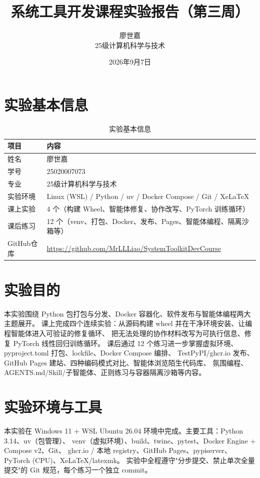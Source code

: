 \documentclass[UTF8]{ctexart}
\title{\textbf{系统工具开发课程实验报告（第三周）}}
\author{廖世嘉 \quad 25020007073 \\ 25级计算机科学与技术}
\date{2026年9月7日}
\begin{document}
\maketitle
\tableofcontents
\newpage

\section{实验基本信息}

\begin{table}[H]
\centering
\caption{实验基本信息}
\label{tab:info}
\begin{tabular}{ll}
\toprule
项目 & 内容 \\
\midrule
姓名 & 廖世嘉 \\
学号 & 25020007073 \\
专业 & 25级计算机科学与技术 \\
实验环境 & Linux (WSL) / Python / uv / Docker Compose / Git / XeLaTeX \\
课上实验 & 4 个（构建 Wheel、智能体修复、协作改写、PyTorch 训练循环）\\
课后练习 & 12 个（venv、打包、Docker、发布、Pages、智能体编程、隔离沙箱等）\\
GitHub仓库 & \href{https://github.com/MrLLLiao/SystemToolkitDevCourse}{https://github.com/MrLLLiao/SystemToolkitDevCourse} \\
\bottomrule
\end{tabular}
\end{table}

\section{实验目的}

本实验围绕 Python 包打包与分发、Docker 容器化、软件发布与智能体编程两大主题展开。
课上完成四个连续实验：从源码构建 wheel 并在干净环境安装、让编程智能体进入可验证的修复循环、
把无法处理的协作材料改写为可执行信息、修复 PyTorch 线性回归训练循环。
课后通过 12 个练习进一步掌握虚拟环境、pyproject.toml 打包、lockfile、Docker Compose 编排、
TestPyPI/ghcr.io 发布、GitHub Pages 建站、四种编码模式对比、智能体浏览陌生代码库、
氛围编程、AGENTS.md/Skill/子智能体、正则练习与容器隔离沙箱等内容。

\section{实验环境与工具}

本实验在 Windows 11 + WSL Ubuntu 26.04 环境中完成。主要工具：Python 3.14、uv（包管理）、
venv（虚拟环境）、build、twine、pytest、Docker Engine + Compose v2、Git、
ghcr.io / 本地 registry、GitHub Pages、pypiserver、PyTorch (CPU)、XeLaTeX/latexmk。
实验中全程遵守"分步提交、禁止单次全量提交"的 Git 规范，每个练习一个独立 commit。
\end{document}
